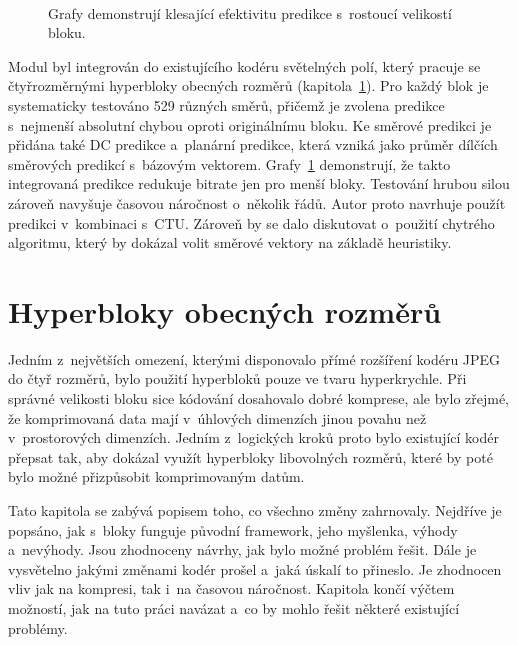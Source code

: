 \begin{figure}[htbp]\centering
  \centering
  \\
  \vspace*{1em}
  \vspace*{1em}
  \caption{Grafy demonstrují klesající efektivitu pre\-dikce s~rostoucí velikostí bloku.}
  \label{fig:pred}
\end{figure}

Modul byl integrován do existujícího kodéru světelných polí, který pracuje se čtyřroz\-měrnými hyperbloky obecných roz\-měrů (kapitola~\ref{hyperbloky}).
Pro každý blok je systematicky testováno 529 různých směrů, přičemž je zvolena pre\-dikce s~nejmenší absolutní chybou oproti originálnímu bloku.
Ke směr\-ové pre\-dikci je přidána také DC pre\-dikce a~planární pre\-dikce, která vzniká jako průměr dílčích směr\-ových pre\-dikcí s~bázovým vektorem.
Grafy~\ref{fig:pred} demonstrují, že takto integrovaná pre\-dikce redukuje bitrate jen pro menší bloky.
Testování hrubou silou zároveň navyšuje časovou náročnost o~ně\-ko\-lik řádů.
Autor proto navrhuje použít pre\-dikci v~kom\-bi\-na\-ci s~CTU.
Zároveň by se dalo diskutovat o~použití chytrého algoritmu, který by dokázal volit směr\-ové vektory na základě heuristiky.

\section{Hyperbloky obecných roz\-měrů} \label{hyperbloky}

Jedním z~největších omezení, kterými disponovalo přímé rozšíření kodéru JPEG do čtyř roz\-měrů, bylo použití hyperbloků pouze ve tvaru hyperkrychle.
Při správné velikosti bloku sice kódování dosahovalo dobré kom\-pre\-se, ale bylo zřejmé, že komprimovaná data mají v~úhlových dimenzích jinou povahu než v~pro\-s\-torových dimenzích.
Jedním z~logických kroků proto bylo existující kodér přepsat tak, aby dokázal využít hyperbloky libovolných roz\-měrů, které by poté bylo možné přizpůsobit komprimovaným datům.

Tato kapitola se zabývá popisem toho, co všechno změny zahrnovaly.
Nejdříve je popsáno, jak s~bloky funguje původní framework, jeho myšlenka, výhody a~nevýhody.
Jsou zhodnoceny návrhy, jak bylo možné problém řešit.
Dále je vysvětelno jakými změnami kodér prošel a~jaká úskalí to přineslo.
Je zhodnocen vliv jak na kom\-pre\-si, tak i~na časovou náročnost.
Kapitola končí výčtem možností, jak na tuto práci navázat a~co by mohlo řešit některé existující problémy.

